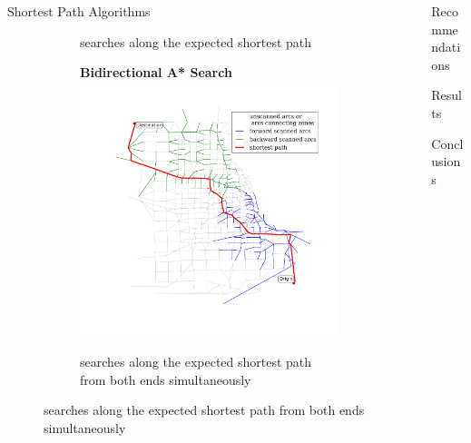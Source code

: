 \documentclass[final]{beamer}
\begin{document}
\begin{frame}{ }
\begin{columns}[t]
\begin{column}{.4\linewidth}
\begin{block}{Shortest Path Algorithms}
\begin{figure}
\begin{subfigure}{.5\linewidth}
                        \caption{searches along the expected shortest path}
                    \end{subfigure}%
                    \begin{subfigure}{.5\linewidth}
                        \centering
                        {\bf Bidirectional A* Search}
                        \includegraphics[width=\linewidth,trim=120px 120px 48px 60px,clip]{img/astar_bidirect}
                        \caption{searches along the expected shortest path from both ends simultaneously} 
                    \end{subfigure}
                \end{figure}
            \end{block}

        \end{column}
        \begin{column}{.28\linewidth}
            
            \begin{block}{Recommendations}
            \end{block}

            \begin{block}{Results}
            \end{block}

            \begin{block}{Conclusions}
            \end{block}

        \end{column}
    \end{columns}
\end{frame}
\end{document}
